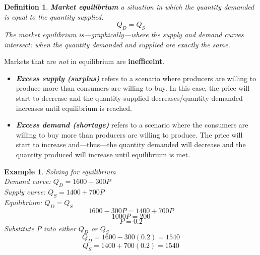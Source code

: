 \documentclass{article}
\newtheorem{example}{Example}[section]
\newtheorem{definition}{Definition}[section]
\newcommand{\bold}[1]{\textbf{#1}}
\newcommand{\define}[1]{\textbf{\textit{#1}}}
\begin{document}
\begin{definition}{\define{Market equilibrium}}
  a situation in which the quantity demanded is equal to the quantity supplied. $$Q_{D}=Q_{S}$$ The market equilibrium is---graphically---where the supply and demand curves intersect: when the quantity demanded and supplied are exactly the same. 
\end{definition}

Markets that are \emph{not} in equilibrium are \bold{inefficeint}. 
\begin{itemize}
  \item \define{Excess supply (surplus)} refers to a scenario where producers are willing to produce more than consumers are willing to buy. In this case, the price will start to decrease and the quantity supplied decreases/quantity demanded increases until equilibrium is reached. 
  \item \define{Excess demand (shortage)} refers to a scenario where the consumers are willing to buy more than producers are willing to produce. The price will start to increase and---thus---the quantity demanded will decrease and the quantity produced will increase until equilibrium is met. 
\end{itemize}

\begin{example}{Solving for equilibrium}
  \\ Demand curve: $Q_D = 1600 - 300P$
  \\ Supply curve: $Q_S = 1400 + 700P$  \\ 
  Equilibrium: $Q_D = Q_S$ 
  $$1600-300P=1400+700P$$
  $$1000P=200$$
  $$P=0.2$$
  Substitute $P$ into either $Q_D$ or $Q_S$ 
  $$Q_D = 1600-300(0.2) = 1540$$ 
  $$Q_S = 1400+700(0.2) = 1540$$
\end{example}
\end{document}
